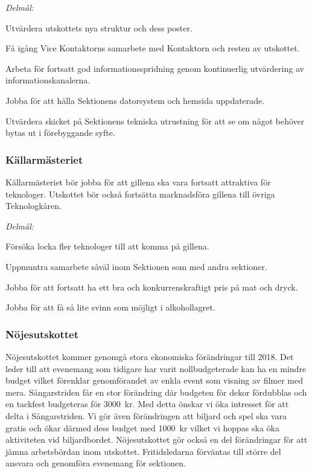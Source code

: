 \documentclass[../_main/handlingar.tex]{subfiles}
\begin{document}
\emph{Delmål:}
\begin{dashlist}
    \item Utvärdera utskottets nya struktur och dess poster.
    \item Få igång Vice Kontaktorns samarbete med Kontaktorn och resten av utskottet.
    \item Arbeta för fortsatt god informationsspridning genom kontinuerlig utvärdering av informationskanalerna.
    \item Jobba för att hålla Sektionens datorsystem och hemsida uppdaterade.
    \item Utvärdera skicket på Sektionens tekniska utrustning för att se om något behöver bytas ut i förebyggande syfte.
\end{dashlist}

\subsubsection*{Källarmästeriet}
Källarmästeriet bör jobba för att gillena ska vara fortsatt attraktiva för teknologer. Utskottet bör också fortsätta marknadsföra gillena till övriga Teknologkåren.

\emph{Delmål:}
\begin{dashlist}
    \item Försöka locka fler teknologer till att komma på gillena.
    \item Uppmuntra samarbete såväl inom Sektionen som med andra sektioner.
    \item Jobba för att fortsatt ha ett bra och konkurrenskraftigt pris på mat och dryck.
    \item Jobba för att få så lite svinn som möjligt i alkohollagret.
\end{dashlist}

\subsubsection*{Nöjesutskottet}
Nöjesutskottet kommer genomgå stora ekonomiska förändringar till 2018. Det leder till att evenemang som tidigare har varit nollbudgeterade kan ha en mindre budget vilket förenklar genomförandet av enkla event som visning av filmer med mera. Sångarstriden får en stor förändring där budgeten för dekor fördubblas och en tackfest budgeteras för \SI{3000}{kr}. Med detta önskar vi öka intresset för att delta i Sångarstriden. Vi gör även förändringen att biljard och spel ska vara gratis och ökar därmed dess budget med \SI{1000}{kr} vilket vi hoppas ska öka aktiviteten vid biljardbordet. Nöjesutskottet gör också en del förändringar för att jämna arbetsbördan inom utskottet. Fritidsledarna förväntas till större del ansvara och genomföra evenemang för sektionen.
\end{document}
